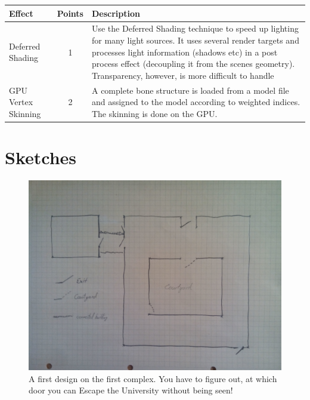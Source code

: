 \documentclass[12pt]{article}
\begin{document}
\begin{table}[h!]
	\centering
	\label{table1}
	\begin{tabular}{p{3cm} | c | p{12cm}}
		Effect & Points & Description\\
		\hline
		Deferred Shading & 1 & Use the Deferred Shading technique to speed up lighting for many light sources. 
		It uses several render targets and processes light information (shadows etc) in a post process effect (decoupling it from the scenes geometry). 
		Transparency, however, is more difficult to handle	\\
		\hline
GPU Vertex Skinning &	2 &	A complete bone structure is loaded from a model file and assigned to the model according to weighted indices. 
		The skinning is done on the GPU. \\
		\hline
		
		\hline
	\end{tabular}
\end{table}


\section*{Sketches} 

\begin{figure}[ht]
	\centering
	\includegraphics[width=1\linewidth]{Images/mapoverview}
	\caption{A first design on the first complex. You have to figure out, at which door you can Escape the University without being seen!}
\end{figure}
\end{document}
